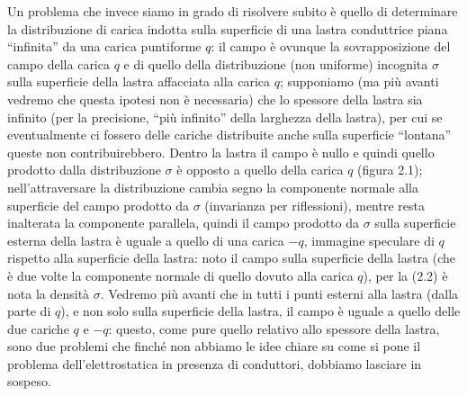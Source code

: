 Un problema che invece siamo in grado di risolvere subito \`e quello di
determinare la distribuzione di carica indotta sulla superficie di una lastra
conduttrice piana ``infinita'' da una carica puntiforme $q$: il campo \`e
ovunque la sovrapposizione del campo della carica $q$ e di quello della
distribuzione (non uniforme) incognita $\sigma$ sulla superficie della lastra
affacciata alla carica $q$; supponiamo (ma pi\`u avanti vedremo che questa
ipotesi non \`e necessaria) che lo spessore della lastra sia infinito (per la
precisione, ``pi\`u infinito'' della larghezza della lastra), per cui se
eventualmente ci fossero delle cariche distribuite anche sulla superficie
``lontana'' queste non contribuirebbero. Dentro la lastra il campo \`e nullo e
quindi quello prodotto dalla distribuzione $\sigma$ \`e opposto a quello della
carica $q$ (figura 2.1); nell'attraversare la distribuzione cambia segno la
componente normale alla superficie del campo prodotto da $\sigma$ (invarianza
per riflessioni), mentre resta inalterata la componente parallela, quindi il
campo prodotto da $\sigma$ sulla superficie esterna della lastra \`e uguale a
quello di una carica $-q$, immagine speculare di $q$ rispetto alla superficie
della lastra: noto il campo sulla superficie della lastra (che \`e due volte la
componente normale di quello dovuto alla carica $q$), per la (2.2) \`e nota la
densit\`a $\sigma$.
Vedremo pi\`u avanti che in tutti i punti esterni alla lastra (dalla parte di
$q$), e non solo sulla superficie della lastra, il campo \`e uguale a quello
delle due cariche $q$ e $-q$: questo, come pure quello relativo allo spessore
della lastra, sono due problemi che finch\'e non abbiamo le idee chiare su come
si pone il problema dell'elettrostatica in presenza di conduttori, dobbiamo
lasciare in sospeso.

